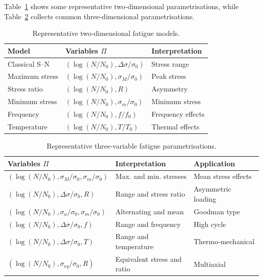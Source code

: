 Table~\ref{tab:2Dmodels} shows some representative two‑dimensional parametrisations, while Table~\ref{tab:3Dmodels} collects common three‑dimensional parametrisations.

\begin{table}[htpb]
\centering
\caption{Representative two‑dimensional fatigue models.}
\label{tab:2Dmodels}
\renewcommand{\arraystretch}{1.35}
\begin{tabular}{lll}
\hline
Model & Variables $\Pi$ & Interpretation \\
\hline
Classical S–N & $(\log(N/N_0),\Delta\sigma/\sigma_0)$ & Stress range \\
Maximum stress & $(\log(N/N_0),\sigma_M/\sigma_0)$ & Peak stress \\
Stress ratio & $(\log(N/N_0),R)$ & Asymmetry \\
Minimum stress & $(\log(N/N_0),\sigma_m/\sigma_0)$ & Minimum stress \\
Frequency & $(\log(N/N_0),f/f_0)$ & Frequency effects \\
Temperature & $(\log(N/N_0),T/T_0)$ & Thermal effects \\
\hline
\end{tabular}
\end{table}

\begin{table}[htpb]
\centering
\caption{Representative three‑variable fatigue parametrisations.}
\label{tab:3Dmodels}
\renewcommand{\arraystretch}{1.35}
\begin{tabular}{lll}
\hline
Variables $\Pi$ & Interpretation & Application \\
\hline
$(\log(N/N_0),\sigma_M/\sigma_0,\sigma_m/\sigma_0)$ & Max. and min. stresses & Mean stress effects \\
$(\log(N/N_0),\Delta\sigma/\sigma_0,R)$ & Range and stress ratio & Asymmetric loading \\
$(\log(N/N_0),\sigma_a/\sigma_0,\sigma_m/\sigma_0)$ & Alternating and mean & Goodman type \\
$(\log(N/N_0),\Delta\sigma/\sigma_0,f)$ & Range and frequency & High cycle \\
$(\log(N/N_0),\Delta\sigma/\sigma_0,T)$ & Range and temperature & Thermo‑mechanical \\
$(\log(N/N_0),\sigma_{eq}/\sigma_0,R)$ & Equivalent stress and ratio & Multiaxial \\
\hline
\end{tabular}
\end{table}


